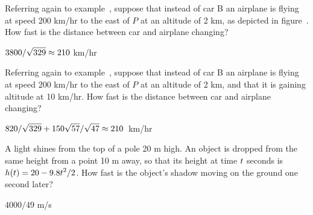 \begin{exercises}
\begin{exercise} Referring again to example~,
suppose that instead of car B an airplane is flying at speed $200$
km/hr to the east of $P$ at an altitude of 2 km, as depicted in
figure~. How fast is the distance between
car and airplane changing?  
\begin{answer} $\displaystyle 3800/\sqrt{329}\approx 210$ km/hr 
\end{answer}\end{exercise}


\begin{exercise} Referring again to example~, suppose
that instead of car B an airplane is flying at speed $200$
km/hr to the east of $P$ at an altitude of 2 km, and that it is
gaining altitude at 10 km/hr.
How fast is
the distance between car and airplane changing?
\begin{answer} \hbox{$\displaystyle 820/\sqrt{329}+150\sqrt{57}/\sqrt{47}\approx 210$ km/hr}
\end{answer}\end{exercise}

\begin{exercise}
A light shines from the top of a pole 20 m high.  An object is dropped from
the same height from a point 10 m away, so that its height at time $\displaystyle t$
seconds is $\displaystyle h(t)=20-9.8t^2/2$.  How fast is the object's shadow
moving on the ground one second later?
\begin{answer} $4000/49$ m/s
\end{answer}\end{exercise}


\end{exercises}
